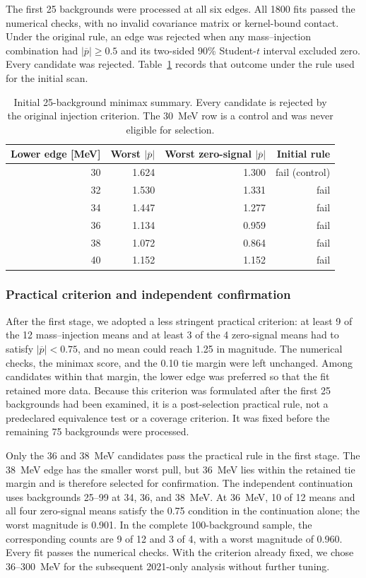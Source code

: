 The first 25 backgrounds were processed at all six edges.  All 1800 fits passed the
numerical checks, with no invalid covariance matrix or kernel-bound contact.  Under the
original rule, an edge was rejected when any mass--injection combination had
$|\overline p|\geq0.5$ and its two-sided 90\% Student-$t$ interval excluded zero.
Every candidate was rejected.  Table~\ref{tab:v4p9p5-phase1} records that outcome under
the rule used for the initial scan.

\begin{table}[htbp]
\centering
\caption{Initial 25-background minimax summary.  Every candidate is rejected by the
original injection criterion.  The 30~MeV row is a control and was never eligible for
selection.}
\label{tab:v4p9p5-phase1}
\begin{tabular}{rrrr}
\toprule
Lower edge [MeV] & Worst $|\overline p|$ & Worst zero-signal $|\overline p|$ & Initial rule \\
\midrule
30 & 1.624 & 1.300 & fail (control) \\
32 & 1.530 & 1.331 & fail \\
34 & 1.447 & 1.277 & fail \\
36 & 1.134 & 0.959 & fail \\
38 & 1.072 & 0.864 & fail \\
40 & 1.152 & 1.152 & fail \\
\bottomrule
\end{tabular}
\end{table}

\subsubsection{Practical criterion and independent confirmation}

After the first stage, we adopted a less stringent practical criterion: at least 9 of
the 12 mass--injection means and at least 3 of the 4 zero-signal means had to satisfy
$|\overline p|<0.75$, and no mean could reach 1.25 in magnitude.  The numerical checks,
the minimax score, and the 0.10 tie margin were left unchanged.  Among candidates within
that margin, the lower edge was preferred so that the fit retained more data.  Because
this criterion was formulated after the first 25 backgrounds had been examined, it is
a post-selection practical rule, not a predeclared equivalence test or a coverage
criterion.  It was fixed before the remaining 75 backgrounds were processed.

Only the 36 and 38~MeV candidates pass the practical rule in the first stage.  The
38~MeV edge has the smaller worst pull, but 36~MeV lies within the retained tie
margin and is therefore selected for confirmation.  The independent continuation uses
backgrounds 25--99 at 34, 36, and 38~MeV. At 36~MeV, 10 of 12 means and all four
zero-signal means satisfy the 0.75 condition in the continuation alone; the worst
magnitude is 0.901.  In the complete 100-background sample, the corresponding counts
are 9 of 12 and 3 of 4, with a worst magnitude of 0.960.  Every fit passes the numerical
checks. With the criterion already fixed, we chose 36--300~MeV for the subsequent
2021-only analysis without further tuning.

